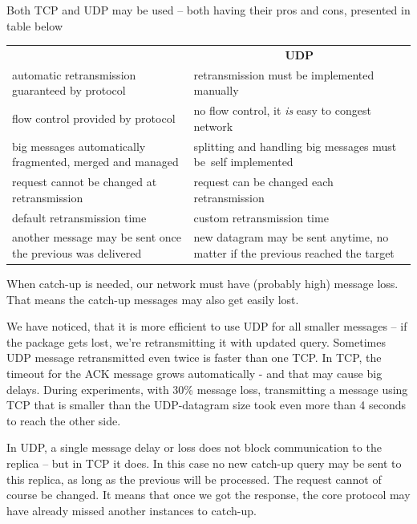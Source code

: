Both TCP and UDP may be used -- both having their pros and cons, presented in table below

\begin{center}
\begin{tabular}{>{\raggedleft\hspace{0pt}}m{}m{}}

\multicolumn{1}{c}{ \textbf{TCP} }& \multicolumn{1}{c}{ \textbf{UDP} } \\ 
automatic retransmission guaranteed by protocol &
                                retransmission must be implemented manually \\ 
flow control provided by protocol & no flow control, it \emph{is} easy to congest network \\
big messages automatically fragmented, mer\-ged and managed &
                                splitting and handling big messages must be~self implemented \vspace{0.5em} \\

request cannot be changed at retransmission &
                                request can be changed each retransmission \\
default retransmission time & custom retransmission time \\
another message may be sent once the previous was delivered &
                                new datagram may be sent anytime, no matter if the previous reached the target \\

\end{tabular}
\end{center}

When catch-up is needed,  our network must have (probably high) message loss. That means the catch-up messages may also get easily lost.

We have noticed, that it is more efficient to use UDP for all smaller messages -- if the package gets lost, we're retransmitting it with updated query. Sometimes UDP message retransmitted even twice is faster than one TCP. In TCP, the timeout for the ACK message grows automatically - and that may cause big delays. During experiments, with 30\% message loss, transmitting a message using TCP that is smaller than the UDP-datagram size took even more than 4 seconds %
to reach the other side.

In UDP, a single message delay or loss does not block communication to the replica -- but in TCP it does.
In this case no new catch-up query may be sent to this replica, as long as the previous will be processed. The request cannot of course be changed. It means that once we got the response, the core protocol may have already missed another instances to catch-up.


